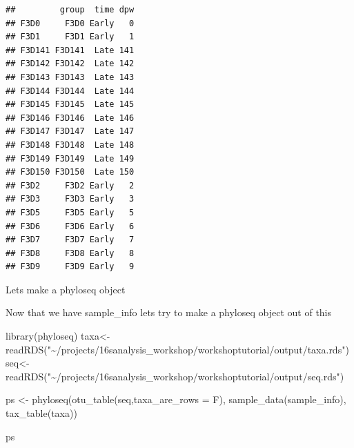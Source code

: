 \documentclass[
]{book}
\newenvironment{Shaded}{\begin{snugshade}}{\end{snugshade}}
\newcommand{\AttributeTok}[1]{\textcolor[rgb]{0.77,0.63,0.00}{#1}}
\newcommand{\FunctionTok}[1]{\textcolor[rgb]{0.00,0.00,0.00}{#1}}
\newcommand{\NormalTok}[1]{#1}
\newcommand{\OtherTok}[1]{\textcolor[rgb]{0.56,0.35,0.01}{#1}}
\newcommand{\SpecialCharTok}[1]{\textcolor[rgb]{0.00,0.00,0.00}{#1}}
\newcommand{\StringTok}[1]{\textcolor[rgb]{0.31,0.60,0.02}{#1}}
\begin{document}
\begin{Shaded}
\end{Shaded}

\begin{verbatim}
##         group  time dpw
## F3D0     F3D0 Early   0
## F3D1     F3D1 Early   1
## F3D141 F3D141  Late 141
## F3D142 F3D142  Late 142
## F3D143 F3D143  Late 143
## F3D144 F3D144  Late 144
## F3D145 F3D145  Late 145
## F3D146 F3D146  Late 146
## F3D147 F3D147  Late 147
## F3D148 F3D148  Late 148
## F3D149 F3D149  Late 149
## F3D150 F3D150  Late 150
## F3D2     F3D2 Early   2
## F3D3     F3D3 Early   3
## F3D5     F3D5 Early   5
## F3D6     F3D6 Early   6
## F3D7     F3D7 Early   7
## F3D8     F3D8 Early   8
## F3D9     F3D9 Early   9
\end{verbatim}

Lets make a phyloseq object

Now that we have sample\_info lets try to make a phyloseq object out of this

\begin{Shaded}
\begin{Highlighting}[]
\FunctionTok{library}\NormalTok{(phyloseq)}
\NormalTok{taxa}\OtherTok{\textless{}{-}}\FunctionTok{readRDS}\NormalTok{(}\StringTok{"\textasciitilde{}/projects/16sanalysis\_workshop/workshoptutorial/output/taxa.rds"}\NormalTok{)}
\NormalTok{seq}\OtherTok{\textless{}{-}}\FunctionTok{readRDS}\NormalTok{(}\StringTok{"\textasciitilde{}/projects/16sanalysis\_workshop/workshoptutorial/output/seq.rds"}\NormalTok{)}

\NormalTok{ps }\OtherTok{\textless{}{-}} \FunctionTok{phyloseq}\NormalTok{(}\FunctionTok{otu\_table}\NormalTok{(seq,}\AttributeTok{taxa\_are\_rows =}\NormalTok{ F),}
               \FunctionTok{sample\_data}\NormalTok{(sample\_info),}
               \FunctionTok{tax\_table}\NormalTok{(taxa))}

\NormalTok{ps}
\end{Highlighting}
\end{Shaded}
\end{document}
